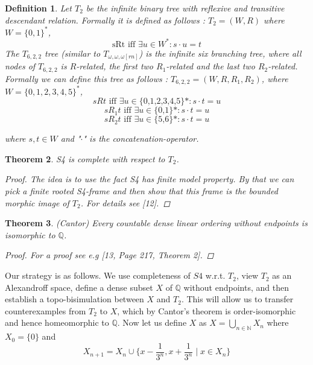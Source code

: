 \documentclass[12pt, a4paper]{scrartcl}
\newtheorem{definition}{Definition}[subsection]
\newtheorem{theorem}[definition]{Theorem}
\begin{document}
\begin{definition}
    Let $T_2$ be the infinite binary tree with reflexive and transitive descendant relation. \newline Formally it is defined as follows :
    $T_2 = (W,R)$ where $W = \{0,1\}^*$, 
    $$ \mbox{sRt iff }  \exists u\in W^* : s \cdot u = t$$ 
    The $T_ {6,2,2}$ tree (similar to $T_{\omega,\omega,\omega[rn]}$) is the infinite six branching tree, where all nodes of $T_ {6,2,2}$ is $R$-related, the first two $R_1$-related 
    and the last two $R_2$-related. Formally we can define this tree as follows : $T_ {6,2,2} = (W,R,R_1,R_2)$,
    where $W = \{{0,1,2,3,4,5}\}^*$, $$sRt \mbox{ iff } \exists u \in \mbox{\{0,1,2,3,4,5\}*} : s \cdot t = u $$
    $$ sR_1t  \mbox{ iff } \exists u \in \mbox{\{0,1\}*} : s \cdot t = u$$
    $$ sR_2t  \mbox{ iff } \exists u \in \mbox{\{5,6\}*} : s \cdot t = u$$
    
    where $s,t \in W$ and "$\cdot$" is the concatenation-operator.        
\end{definition}

\begin{theorem}
    S4 is complete with respect to $T_2$.

    \begin{proof}
    The idea is to use the fact S4 has finite model property. By that we can pick a finite rooted S4-frame and then show that this frame is the bounded morphic image of $T_2$.
        For details see [12].
    \end{proof}
\end{theorem}

\begin{theorem}

    (Cantor) Every countable dense linear ordering without endpoints is isomorphic to $\mathbb{Q}$.
    \begin{proof}
        For a proof see e.g [13, Page 217, Theorem 2].   
    \end{proof}

\end{theorem}

Our strategy is as follows. We use completeness of $S4$ w.r.t. $T_2$, view $T_2$ as an Alexandroff space, define a dense subset $X$ of $\mathbb{Q}$ without endpoints,
and then establish a topo-bisimulation between $X$ and $T_2$. This will allow us to transfer counterexamples from $T_2$ to $X$, which by Cantor's theorem
is order-isomorphic and hence homeomorphic to $\mathbb{Q}$. \newline 
Now let us define $X$ as $X = \bigcup_{n \in \mathbb{N}} X_n$ where $X_0 = \{0\}$ and 
$$X_{n+1} = X_n \cup \{x - \frac{1}{3^n}, x + \frac{1}{3^n} \mid x \in X_n\}$$
\clearpage 
\end{document}

